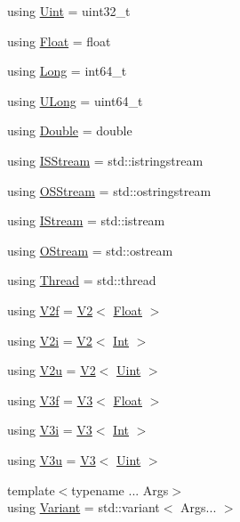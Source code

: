 \begin{DoxyCompactItemize}
\item 
using \mbox{\hyperlink{namespaceo_a_abe1d8250226c5cf34f84d7b75fc7922e}{Uint}} = uint32\+\_\+t
\item 
using \mbox{\hyperlink{namespaceo_a_a513e9cb16924b482268ab3fcdf1f2499}{Float}} = float
\item 
using \mbox{\hyperlink{namespaceo_a_ab34d92c907da3ac86211277a1341c6c2}{Long}} = int64\+\_\+t
\item 
using \mbox{\hyperlink{namespaceo_a_aeb20ba1e00df0faadde3654ff7d8c4e7}{U\+Long}} = uint64\+\_\+t
\item 
using \mbox{\hyperlink{namespaceo_a_a2bcc976232176d2dcf8b9df1fa33c038}{Double}} = double
\item 
using \mbox{\hyperlink{namespaceo_a_a60595f5d8b3d5dbbb9d1ed512917b09b}{I\+S\+Stream}} = std\+::istringstream
\item 
using \mbox{\hyperlink{namespaceo_a_a9075675ddf98c92f09ba17d3b993a72a}{O\+S\+Stream}} = std\+::ostringstream
\item 
using \mbox{\hyperlink{namespaceo_a_ae8cec630e608110423350d900ee22e73}{I\+Stream}} = std\+::istream
\item 
using \mbox{\hyperlink{namespaceo_a_ab69b2110953f22401259db9c6ddc7905}{O\+Stream}} = std\+::ostream
\item 
using \mbox{\hyperlink{namespaceo_a_a38e502e26381eb0b98c9a03430e4dcce}{Thread}} = std\+::thread
\item 
using \mbox{\hyperlink{namespaceo_a_a6de6b1704d5ba4ceac954fdebaee0d79}{V2f}} = \mbox{\hyperlink{structo_a_1_1_v2}{V2}}$<$ \mbox{\hyperlink{namespaceo_a_a513e9cb16924b482268ab3fcdf1f2499}{Float}} $>$
\item 
using \mbox{\hyperlink{namespaceo_a_aeddbfac9ac1bbff3d9640251439b33aa}{V2i}} = \mbox{\hyperlink{structo_a_1_1_v2}{V2}}$<$ \mbox{\hyperlink{namespaceo_a_aa575525a7b0116822c73d43fa671a58c}{Int}} $>$
\item 
using \mbox{\hyperlink{namespaceo_a_a20f57c861441be662b592b15a492f29e}{V2u}} = \mbox{\hyperlink{structo_a_1_1_v2}{V2}}$<$ \mbox{\hyperlink{namespaceo_a_abe1d8250226c5cf34f84d7b75fc7922e}{Uint}} $>$
\item 
using \mbox{\hyperlink{namespaceo_a_a795c21de788620b8fb6c14bf3046dcf9}{V3f}} = \mbox{\hyperlink{structo_a_1_1_v3}{V3}}$<$ \mbox{\hyperlink{namespaceo_a_a513e9cb16924b482268ab3fcdf1f2499}{Float}} $>$
\item 
using \mbox{\hyperlink{namespaceo_a_a1b5e3fb31926401708aa4000145a58ef}{V3i}} = \mbox{\hyperlink{structo_a_1_1_v3}{V3}}$<$ \mbox{\hyperlink{namespaceo_a_aa575525a7b0116822c73d43fa671a58c}{Int}} $>$
\item 
using \mbox{\hyperlink{namespaceo_a_ae91b6ba950b8f72e43ee17b69dbfeaad}{V3u}} = \mbox{\hyperlink{structo_a_1_1_v3}{V3}}$<$ \mbox{\hyperlink{namespaceo_a_abe1d8250226c5cf34f84d7b75fc7922e}{Uint}} $>$
\item 
{\footnotesize template$<$typename ... Args$>$ }\\using \mbox{\hyperlink{namespaceo_a_a46a1498e4e673b19327a24fac0018867}{Variant}} = std\+::variant$<$ Args... $>$
\end{DoxyCompactItemize}
